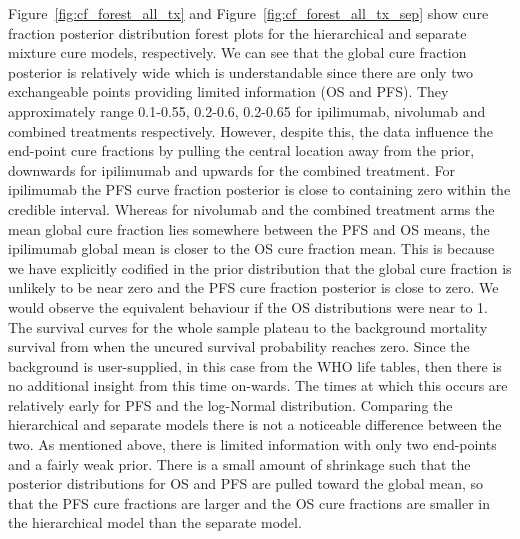 \documentclass[AMA,STIX1COL]{WileyNJD-v2}
\begin{document}
Figure~\ref{fig:cf_forest_all_tx} and Figure~\ref{fig:cf_forest_all_tx_sep} show cure fraction posterior distribution forest plots for the hierarchical and separate mixture cure models, respectively. 
We can see that the global cure fraction posterior is relatively wide which is understandable since there are only two exchangeable points providing limited information (OS and PFS).
They approximately range 0.1-0.55, 0.2-0.6, 0.2-0.65 for ipilimumab, nivolumab and combined treatments respectively. 
However, despite this, the data influence the end-point cure fractions by pulling the central location away from the prior, downwards for ipilimumab and upwards for the combined treatment.
For ipilimumab the PFS curve fraction posterior is close to containing zero within the credible interval.
Whereas for nivolumab and the combined treatment arms the mean global cure fraction lies somewhere between the PFS and OS means, the ipilimumab global mean is closer to the OS cure fraction mean. This is because we have explicitly codified in the prior distribution that the global cure fraction is unlikely to be near zero and the PFS cure fraction posterior is close to zero.
We would observe the equivalent behaviour if the OS distributions were near to 1.
The survival curves for the whole sample plateau to the background mortality survival from when the uncured survival probability reaches zero.
Since the background is user-supplied, in this case from the WHO life tables, then there is no additional insight from this time on-wards.
The times at which this occurs are relatively early for PFS and the log-Normal distribution.
Comparing the hierarchical and separate models there is not a noticeable difference between the two.
As mentioned above, there is limited information with only two end-points and a fairly weak prior.
There is a small amount of shrinkage such that the posterior distributions for OS and PFS are pulled toward the global mean, so that the PFS cure fractions are larger and the OS cure fractions are smaller in the hierarchical model than the separate model.
\end{document}
